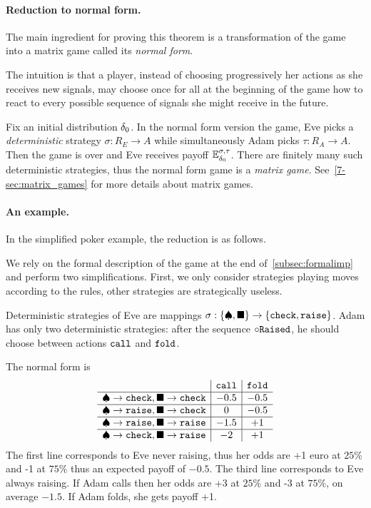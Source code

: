 \paragraph{Reduction to normal form.}
The main ingredient for proving this theorem is a transformation
of the game into a matrix game called its \emph{normal form}.

The intuition is that a player,
instead of choosing progressively her actions
as she receives new signals,
may choose once for all at the beginning of the game
how to react to every possible sequence of signals
she might receive in the future.

Fix an initial distribution $\delta_0$.
In the normal form version the game,
Eve  picks 
a \emph{deterministic} strategy
$\sigma : R_E \to A$
while simultaneously
Adam picks
$\tau : R_A \to A$.
Then the game is over
and Eve receives payoff
$\mathbb{E}_{\delta_0}^{\sigma,\tau}$.
There are finitely many such deterministic strategies,
thus the normal form game is a \emph{matrix game}.
See~\cref{7-sec:matrix_games} for more details
about matrix games.


\paragraph{An example.}
In the simplified poker example,
the reduction is as follows.

We rely on the formal description of the game at the end of~\cref{subsec:formalimp}
and perform two simplifications.
First, we only consider strategies playing moves according to the rules,
other strategies are strategically useless.


Deterministic strategies of Eve are
mappings $\sigma : \{\spadesuit,\blacksquare\}
\to\{ {\tt check},{\tt raise}\}$.
Adam has only two deterministic strategies:
after the sequence $\circ {\tt Raised}$,
he should choose between
actions ${\tt call}$ and ${\tt fold}$.

The normal form is
\[
\begin{array}{c|c|c}
&  {\tt call} &{\tt fold}\\
\hline
\spadesuit\to {\tt check},  \blacksquare\to {\tt check}
& -0.5 & -0.5\\
\hline
\spadesuit\to {\tt raise},  \blacksquare\to {\tt check}
& 0 & -0.5\\
\hline
\spadesuit\to {\tt raise},  \blacksquare\to {\tt raise}
& -1.5 & +1\\
\hline
\spadesuit\to {\tt check},  \blacksquare\to {\tt raise}
& -2 & +1\\
\end{array}
\]
The first line corresponds to Eve never raising,
thus her odds are +1 euro at $25\%$ 
and -1 at $75\%$ thus an expected payoff of
$-0.5$.
The third line corresponds to Eve always raising.
If Adam calls then her odds are +3 at $25\%$
and -3 at $75\%$, on average $-1.5$.
If Adam folds, she gets payoff +1.


